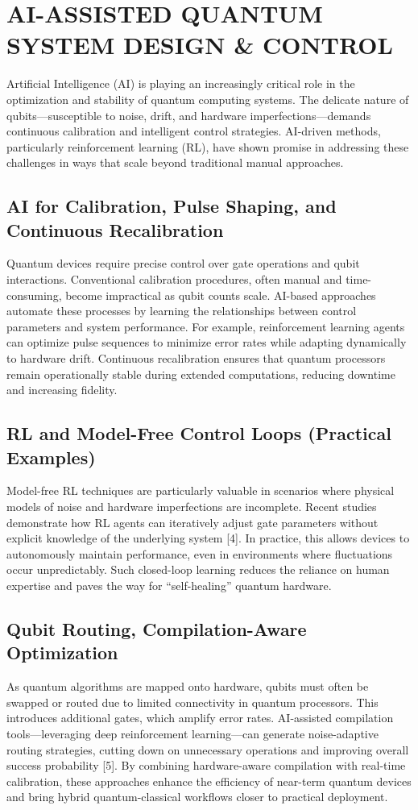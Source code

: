 \chapter{AI-ASSISTED QUANTUM SYSTEM DESIGN \& CONTROL}
\hspace*{0.3in}Artificial Intelligence (AI) is playing an increasingly critical role in the optimization and stability of quantum computing systems. The delicate nature of qubits—susceptible to noise, drift, and hardware imperfections—demands continuous calibration and intelligent control strategies. AI-driven methods, particularly reinforcement learning (RL), have shown promise in addressing these challenges in ways that scale beyond traditional manual approaches.
\section{AI for Calibration, Pulse Shaping, and Continuous Recalibration}
\hspace*{0.3in}Quantum devices require precise control over gate operations and qubit interactions. Conventional calibration procedures, often manual and time-consuming, become impractical as qubit counts scale. AI-based approaches automate these processes by learning the relationships between control parameters and system performance. For example, reinforcement learning agents can optimize pulse sequences to minimize error rates while adapting dynamically to hardware drift. Continuous recalibration ensures that quantum processors remain operationally stable during extended computations, reducing downtime and increasing fidelity.
\section{RL and Model-Free Control Loops (Practical Examples)}
\hspace*{0.3in}Model-free RL techniques are particularly valuable in scenarios where physical models of noise and hardware imperfections are incomplete. Recent studies demonstrate how RL agents can iteratively adjust gate parameters without explicit knowledge of the underlying system [4]. In practice, this allows devices to autonomously maintain performance, even in environments where fluctuations occur unpredictably. Such closed-loop learning reduces the reliance on human expertise and paves the way for “self-healing” quantum hardware.
\section{Qubit Routing, Compilation-Aware Optimization}
\hspace*{0.3in}As quantum algorithms are mapped onto hardware, qubits must often be swapped or routed due to limited connectivity in quantum processors. This introduces additional gates, which amplify error rates. AI-assisted compilation tools—leveraging deep reinforcement learning—can generate noise-adaptive routing strategies, cutting down on unnecessary operations and improving overall success probability [5]. By combining hardware-aware compilation with real-time calibration, these approaches enhance the efficiency of near-term quantum devices and bring hybrid quantum-classical workflows closer to practical deployment.

